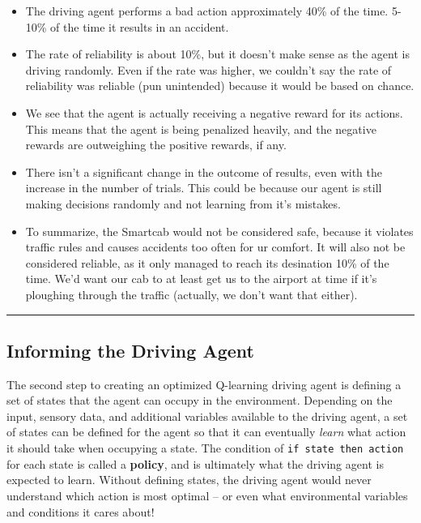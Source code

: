 \documentclass[11pt]{article}
\providecommand{\tightlist}{%
      \setlength{\itemsep}{0pt}\setlength{\parskip}{0pt}}
\begin{document}
\begin{itemize}
\tightlist
\item
  The driving agent performs a bad action approximately 40\% of the
  time. 5-10\% of the time it results in an accident.
\item
  The rate of reliability is about 10\%, but it doesn't make sense as
  the agent is driving randomly. Even if the rate was higher, we
  couldn't say the rate of reliability was reliable (pun unintended)
  because it would be based on chance.
\item
  We see that the agent is actually receiving a negative reward for its
  actions. This means that the agent is being penalized heavily, and the
  negative rewards are outweighing the positive rewards, if any.
\item
  There isn't a significant change in the outcome of results, even with
  the increase in the number of trials. This could be because our agent
  is still making decisions randomly and not learning from it's
  mistakes.
\item
  To summarize, the Smartcab would not be considered safe, because it
  violates traffic rules and causes accidents too often for ur comfort.
  It will also not be considered reliable, as it only managed to reach
  its desination 10\% of the time. We'd want our cab to at least get us
  to the airport at time if it's ploughing through the traffic
  (actually, we don't want that either).
\end{itemize}

    \begin{center}\rule{0.5\linewidth}{\linethickness}\end{center}

\hypertarget{informing-the-driving-agent}{%
\subsection{Informing the Driving
Agent}\label{informing-the-driving-agent}}

The second step to creating an optimized Q-learning driving agent is
defining a set of states that the agent can occupy in the environment.
Depending on the input, sensory data, and additional variables available
to the driving agent, a set of states can be defined for the agent so
that it can eventually \emph{learn} what action it should take when
occupying a state. The condition of
\texttt{\textquotesingle{}if\ state\ then\ action\textquotesingle{}} for
each state is called a \textbf{policy}, and is ultimately what the
driving agent is expected to learn. Without defining states, the driving
agent would never understand which action is most optimal -- or even
what environmental variables and conditions it cares about!
\end{document}
